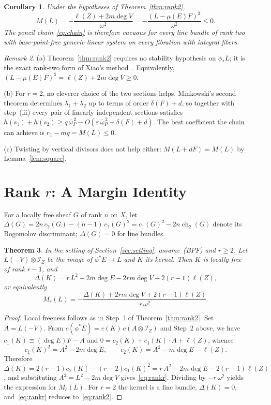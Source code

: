 \documentclass[11pt]{article}
\newtheorem{theorem}{Theorem}[section]
\newtheorem{corollary}[theorem]{Corollary}
\theoremstyle{definition}
\theoremstyle{remark}
\newtheorem{remark}[theorem]{Remark}
\DeclareMathOperator{\ch}{ch}
\newcommand{\cI}{\mathcal{I}}
\newcommand{\ob}{\overline{\omega}}
\newcommand{\bpf}{\textup{(BPF)}}
\begin{document}
\begin{corollary}\label{cor:rank2}
Under the hypotheses of Theorem~\ref{thm:rank2},
\[
M(L)=-\frac{\ell(Z)+2m\deg V}{\omega^2}=-\frac{(L-\mu(E)F)^2}{\omega^2}\le 0 .
\]
The pencil chain~\eqref{eq:chain} is therefore vacuous for every line bundle of
rank two with base-point-free generic linear system on every fibration with
integral fibers.
\end{corollary}

\begin{remark}\label{rem:rank2}
(a) Theorem~\ref{thm:rank2} requires no stability hypothesis on $\phi_*L$; it is
the exact rank-two form of Xiao's method~\cite{Xi87}. Equivalently,
$(L-\mu(E)F)^2=\ell(Z)+2m\deg V\ge 0$.

(b) For $r=2$, no cleverer choice of the two sections helps. Minkowski's second
theorem determines $\lambda_1+\lambda_2$ up to terms of order $\delta(F)+d$, so
together with step~(iii) every pair of linearly independent sections satisfies
$h(s_1)+h(s_2)\ge q\,\ob_P^{\,2}-O(\varepsilon\,\ob_P^{\,2}+\delta(F)+d)$. The
best coefficient the chain can achieve is $r_1-mq=M(L)\le 0$.

(c) Twisting by vertical divisors does not help either: $M(L+dF)=M(L)$ by
Lemma~\ref{lem:square}.
\end{remark}

\section{Rank \texorpdfstring{$r$}{r}: A Margin Identity}\label{sec:rankr}

For a locally free sheaf $G$ of rank $n$ on $X$, let
$\Delta(G)=2n\,c_2(G)-(n-1)\,c_1(G)^2=c_1(G)^2-2n\ch_2(G)$ denote its Bogomolov
discriminant; $\Delta(G)=0$ for line bundles.

\begin{theorem}\label{thm:rankr}
In the setting of Section~\ref{sec:setting}, assume~\bpf{} and $r\ge 2$. Let
$L(-V)\otimes\cI_Z$ be the image of $\phi^*E\to L$ and $K$ its kernel. Then $K$ is
locally free of rank $r-1$, and
\begin{equation}\label{eq:rankr}
\Delta(K)=r\,L^2-2m\deg E-2rm\deg V-2(r-1)\ell(Z),
\end{equation}
or equivalently
\[
M_r(L)=-\frac{\Delta(K)+2rm\deg V+2(r-1)\ell(Z)}{r\,\omega^2}.
\]
\end{theorem}

\begin{proof}
Local freeness follows as in Step~1 of Theorem~\ref{thm:rank2}. Set $A=L(-V)$.
From $c(\phi^*E)=c(K)\,c(A\otimes\cI_Z)$ and Step~2 above, we have
$c_1(K)\equiv(\deg E)F-A$ and $0=c_2(K)+c_1(K)\cdot A+\ell(Z)$, whence
\[
c_1(K)^2=A^2-2m\deg E,\qquad c_2(K)=A^2-m\deg E-\ell(Z).
\]
Therefore
$\Delta(K)=2(r-1)c_2(K)-(r-2)c_1(K)^2=r\,A^2-2m\deg E-2(r-1)\ell(Z)$, and
substituting $A^2=L^2-2m\deg V$ gives~\eqref{eq:rankr}. Dividing by $-r\,\omega^2$
yields the expression for $M_r(L)$. For $r=2$ the kernel is a line bundle,
$\Delta(K)=0$, and~\eqref{eq:rankr} reduces to~\eqref{eq:rank2}.
\end{proof}
\end{document}

